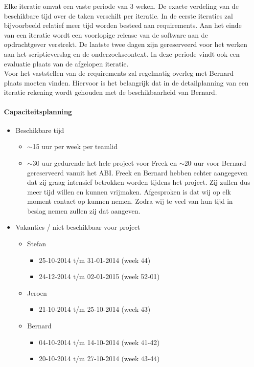 Elke iteratie omvat een vaste periode van 3 weken.
De exacte verdeling van de beschikbare tijd over de taken verschilt per iteratie.
In de eerste iteraties zal bijvoorbeeld relatief meer tijd worden besteed aan requirements.
Aan het einde van een iteratie wordt een voorlopige release van de software aan de
opdrachtgever verstrekt. De laatste twee dagen zijn gereserveerd voor het werken
aan het scriptieverslag en de onderzoekscontext. In deze periode vindt
ook een evaluatie plaats van de afgelopen iteratie. \\
Voor het vaststellen van de requirements zal regelmatig overleg met Bernard plaats
moeten vinden. Hiervoor is het belangrijk dat in de detailplanning van een iteratie
rekening wordt gehouden met de beschikbaarheid van Bernard.

\pagebreak

\paragraph{Capaciteitsplanning}

\begin{itemize}
 \item Beschikbare tijd
 \begin{itemize}
  \item $\sim$15 uur per week per teamlid
  \item $\sim$30 uur gedurende het hele project voor Freek en $\sim$20 uur voor Bernard
        gereserveerd vanuit het ABI. Freek en Bernard hebben echter aangegeven dat zij graag
        intensief betrokken worden tijdens het project. Zij zullen dus meer tijd willen
        en kunnen vrijmaken. Afgesproken is dat wij op elk moment contact op kunnen nemen.
        Zodra wij te veel van hun tijd in beslag nemen zullen zij dat aangeven.
 \end{itemize}


 \item Vakanties / niet beschikbaar voor project
 \begin{itemize}

  \item Stefan
  \begin{itemize}
   \item 25-10-2014 t/m 31-01-2014 (week 44)
   \item 24-12-2014 t/m 02-01-2015 (week 52-01)
  \end{itemize}

  \item Jeroen
  \begin{itemize}
   \item 21-10-2014 t/m 25-10-2014 (week 43)
  \end{itemize}

  \item Bernard
   \begin{itemize}
    \item 04-10-2014 t/m 14-10-2014 (week 41-42)
    \item 20-10-2014 t/m 27-10-2014 (week 43-44)
   \end{itemize}

 \end{itemize}
\end{itemize}
